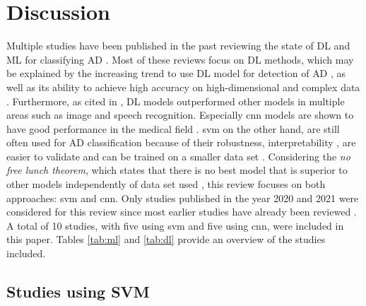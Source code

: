 \section{Discussion} \label{Discussion} 

Multiple studies have been published in the past reviewing the state of \gls{DL} and \gls{ML} for classifying \gls{AD} \autocite[see][]{ebrahimighahnaviehDeepLearningDetect2020,joDeepLearningAlzheimer2019, tanveerMachineLearningTechniques2020, wenConvolutionalNeuralNetworks2020, noorApplicationDeepLearning2020}. Most of these reviews focus on \gls{DL} methods, which may be explained by the increasing trend to use \gls{DL} model for detection of \gls{AD} \autocite{ebrahimighahnaviehDeepLearningDetect2020}, as well as its ability to achieve high accuracy on high-dimensional and complex data \autocite{tanveerMachineLearningTechniques2020, lecunDeepLearning2015a}. Furthermore, as cited in \textcite{lecunDeepLearning2015a}, \gls{DL} models  outperformed other models in multiple areas such as image and speech recognition. Especially \gls{cnn} models are shown to have good performance in the medical field \autocite{ebrahimighahnaviehDeepLearningDetect2020}. \gls{svm} on the other hand, are still often used for \gls{AD} classification because of their robustness, interpretability \autocite{tanveerMachineLearningTechniques2020}, are easier to validate and can be trained on a smaller data set \autocite{syaifullahMachineLearningDiagnosis2021}. 
Considering the \textit{no free lunch theorem}, which states that there is no best model that is superior to other models independently of data set used \autocite{introtostat, deeplearningav}, this review focuses on both approaches: \gls{svm} and \gls{cnn}. 
Only studies published in the year 2020 and 2021 were considered for this review since most earlier studies have already been reviewed \autocite[see][]{ebrahimighahnaviehDeepLearningDetect2020,joDeepLearningAlzheimer2019, tanveerMachineLearningTechniques2020, wenConvolutionalNeuralNetworks2020, noorApplicationDeepLearning2020}. A total of 10 studies, with five using \gls{svm} and five using \gls{cnn}, were included in this paper. Tables \ref{tab:ml} and \ref{tab:dl} provide an overview of the studies included.  

\subsection{Studies using SVM}

